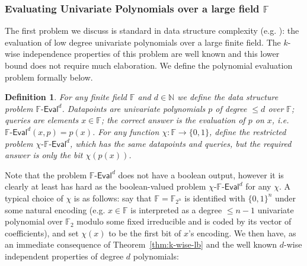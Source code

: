 \documentclass[11pt]{article}
\newtheorem{definition}{Definition}
\newcommand{\dash}{\text{-}}
\newcommand{\B}{\{0,1\}}
\begin{document}
\subsubsection{Evaluating Univariate Polynomials over a large field $\mathbb{F}$}
The first problem we discuss is standard in data structure complexity (e.g. \cite{kasper,golovnev}): the evaluation of low degree univariate polynomials over a large finite field. The $k$-wise independence properties of this problem are well known and this lower bound does not require much elaboration. 
We define the polynomial evaluation problem formally below.
\begin{definition}
For any finite field $\mathbb{F}$ and $d\in \mathbb{N}$ we define the data structure problem $\mathbb{F}\dash\mathsf{Eval}^d$. Datapoints are univariate polynomials $p$ of degree $\leq d$ over $\mathbb{F}$; queries are elements $x \in \mathbb{F}$; the correct answer is the evaluation of $p$ on $x$, i.e. $\mathbb{F}\dash\mathsf{Eval}^d(x,p) = p(x)$.
For any function $\chi: \mathbb{F} \to \B$, define the restricted problem $\chi\dash\mathbb{F}\dash\mathsf{Eval}^d$, which has the same datapoints and queries, but the required answer is only the bit $\chi(p(x))$. 
\end{definition}
Note that the problem $\mathbb{F}\dash\mathsf{Eval}^d$ does not have a boolean output, however it is clearly at least has hard as the boolean-valued problem $\chi\dash\mathbb{F}\dash\mathsf{Eval}^d$ for any $\chi$. A typical choice of $\chi$ is as follows: say that $\mathbb{F}=\mathbb{F}_{2^n}$ is identified with $\B^n$ under some natural encoding (e.g. $x \in \mathbb{F}$ is interpreted as a degree $\leq n-1$ univariate polynomial over $\mathbb{F}_2$ modulo some fixed irreducible and is coded by its vector of coefficients), and set $\chi(x)$ to be the first bit of $x$'s encoding.
We then have, as an immediate consequence of Theorem~\ref{thm:k-wise-lb} and the well known $d$-wise independent properties of degree $d$ polynomials:
\end{document}
